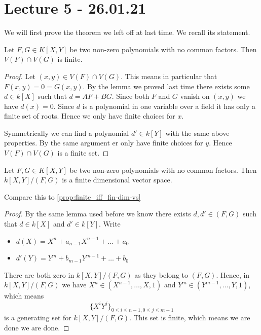 
\section{Lecture 5 - 26.01.21}

We will first prove the theorem we left off at last time. We recall its statement.

\begin{theorem}
Let $F, G\in K[X, Y]$ be two non-zero polynomials with no common factors. Then $V(F)\cap V(G)$ is finite. 
\end{theorem}
\begin{proof}
Let $(x, y)\in V(F)\cap V(G)$. This means in particular that $F(x, y)=0=G(x, y)$. By the lemma we proved last time there exists some $d\in k[X]$ such that $d=AF+BG$. Since both $F$ and $G$ vanish on $(x, y)$ we have $d(x)=0$. Since $d$ is a polynomial in one variable over a field it has only a finite set of roots. Hence we only have finite choices for $x$. 

Symmetrically we can find a polynomial $d'\in k[Y]$ with the same above properties. By the same argument er only have finite choices for $y$. Hence $V(F)\cap V(G)$ is a finite set. 
\end{proof}

\begin{theorem}
Let $F, G\in K[X, Y]$ be two non-zero polynomials with no common factors. Then $k[X, Y]/(F, G)$ is a finite dimensional vector space. 
\end{theorem}
\begin{problem}
Compare this to \cref{prop:finite_iff_fin-dim-vs}
\end{problem}
\begin{proof}
By the same lemma used before we know there exists $d, d'\in (F, G)$ such that $d\in k[X]$ and $d'\in k[Y]$. Write
\begin{itemize}
    \item $d(X)=X^n+a_{n-1}X^{n-1}+\ldots +a_0$
    \item $d'(Y)=Y^m+b_{m-1}Y^{m-1}+\ldots +b_0$
\end{itemize}
There are both zero in $k[X, Y]/(F, G)$ as they belong to $(F, G)$. Hence, in $k[X, Y]/(F, G)$ we have $X^n\in (X^{n-1}, \ldots, X, 1)$ and $Y^m\in (Y^{m-1}, \ldots, Y, 1)$, which means
\begin{equation*}
    \{ X^i Y^j \}_{0\leq i\leq n-1, 0\leq j\leq m-1}
\end{equation*}
is a generating set for $k[X, Y]/(F, G)$. This set is finite, which means we are done we are done. 
\end{proof}

